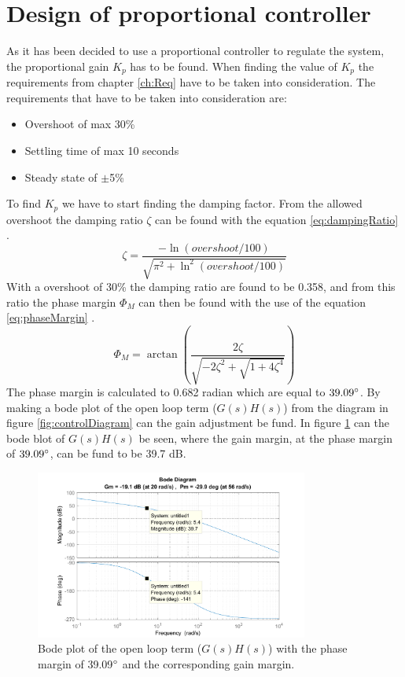 \section{Design of proportional controller}\label{sec:design_controller}
As it has been decided to use a proportional controller to regulate the system, the proportional gain $K_p$ has to be found. 
When finding the value of $K_p$ the requirements from chapter \ref{ch:Req} have to be taken into consideration. 
The requirements that have to be taken into consideration are:
\begin{itemize}
    \item Overshoot of max 30\%
    \item Settling time of  max 10 seconds
    \item Steady state of $\pm$5\%
\end{itemize}
To find $K_p$ we have to start finding the damping factor. From the allowed overshoot the damping ratio $\zeta$ can be found with the equation \ref{eq:dampingRatio} \cite{nise2007control}.
\begin{equation}\label{eq:dampingRatio}
    \zeta = \frac{-\ln(overshoot/100)}{\sqrt{\pi^2+\ln^2(overshoot/100)}}
\end{equation}
With a overshoot of 30\% the damping ratio are found to be 0.358, and from this ratio the phase margin $\Phi_M$ can then be found with the use of the equation \ref{eq:phaseMargin} \cite{nise2007control}.
\begin{equation}\label{eq:phaseMargin}
    \Phi_M = \arctan\left(\frac{2\zeta}{\sqrt{-2\zeta^2+\sqrt{1+4\zeta^4}}}\right)
\end{equation}
The phase margin is calculated to 0.682 radian which are equal to $39.09\degree$. By making a bode plot of the open loop term ($G(s)H(s)$) from  the diagram in figure \ref{fig:controlDiagram} can the gain adjustment be fund.
In figure \ref{fig:des_bodeplot} can the bode blot of $G(s)H(s)$ be seen, where the gain margin, at the phase margin of $39.09\degree$, can be fund to be 39.7 dB.
\begin{figure}[h]
    \centering
    \includegraphics[width=0.8\textwidth]{figures/ch_design/controller/bodeplot.png}
    \caption{Bode plot of the open loop term ($G(s)H(s)$) with the phase margin of 39.09$\degree$ and the corresponding gain margin.} 
    \label{fig:des_bodeplot}
\end{figure}
